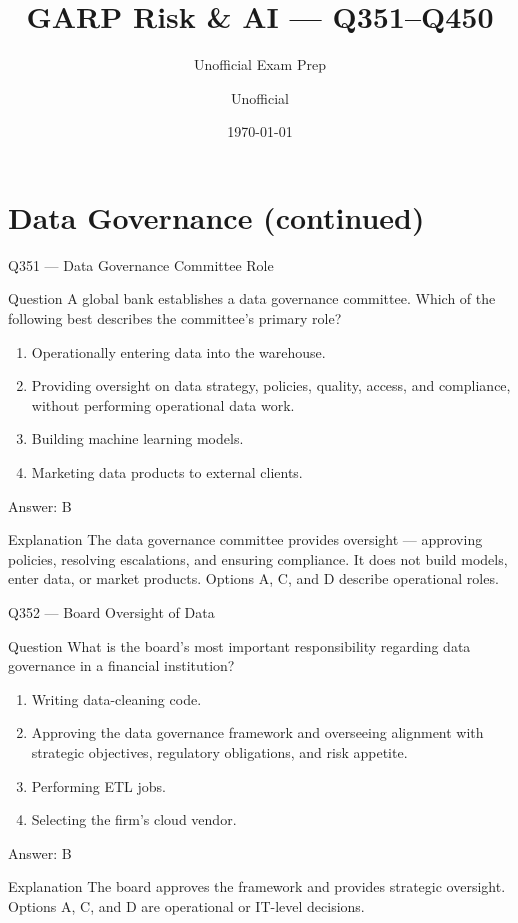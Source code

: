 \documentclass[aspectratio=169,8pt]{beamer}
\title[GARP RAI]{GARP Risk \& AI --- Q351--Q450}
\subtitle{Unofficial Exam Prep}
\author{Unofficial}
\date{\today}
\begin{document}
	
	\begin{frame}
		\titlepage
	\end{frame}
	
	\section{Data Governance (continued)}
	
	\begin{frame}{Q351 --- Data Governance Committee Role}
		\begin{block}{Question}
			A global bank establishes a data governance committee. Which of the following best describes the committee's primary role?
			\begin{enumerate}
				\item Operationally entering data into the warehouse.
				\item Providing oversight on data strategy, policies, quality, access, and compliance, without performing operational data work.
				\item Building machine learning models.
				\item Marketing data products to external clients.
			\end{enumerate}
		\end{block}
		\begin{exampleblock}{Answer: B}\end{exampleblock}
		\begin{block}{Explanation}
			The data governance committee provides oversight --- approving policies, resolving escalations, and ensuring compliance. It does not build models, enter data, or market products. Options A, C, and D describe operational roles.
		\end{block}
	\end{frame}
	
	\begin{frame}{Q352 --- Board Oversight of Data}
		\begin{block}{Question}
			What is the board's most important responsibility regarding data governance in a financial institution?
			\begin{enumerate}
				\item Writing data-cleaning code.
				\item Approving the data governance framework and overseeing alignment with strategic objectives, regulatory obligations, and risk appetite.
				\item Performing ETL jobs.
				\item Selecting the firm's cloud vendor.
			\end{enumerate}
		\end{block}
		\begin{exampleblock}{Answer: B}\end{exampleblock}
		\begin{block}{Explanation}
			The board approves the framework and provides strategic oversight. Options A, C, and D are operational or IT-level decisions.
		\end{block}
	\end{frame}
	
\end{document}
